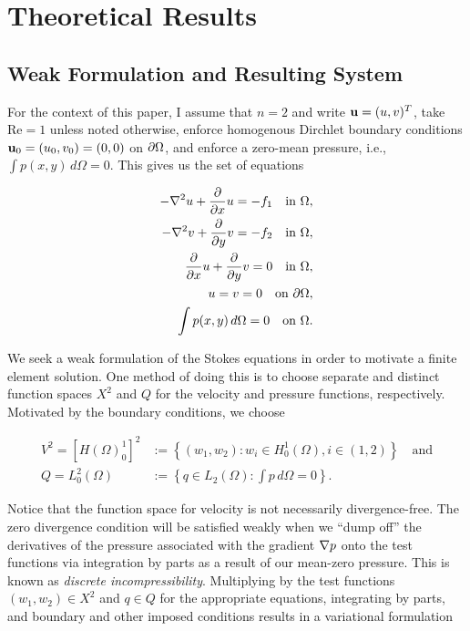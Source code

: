 \documentclass[12pt]{article}
\begin{document}
\section{Theoretical Results}

\subsection{Weak Formulation and Resulting System}

For the context of this paper, I assume that $n = 2$ and write $\mathbf{u} =
(u,v){^T}$, take $\text{Re} = 1$ unless noted otherwise, enforce homogenous
Dirchlet boundary conditions $\mathbf{u}_0 = (u_0, v_0) = (0, 0)$ on $\partial \Omega$,
and enforce a zero-mean pressure, i.e., $\int p(x,y) \, d\Omega = 0$. This
gives us the set of equations

\begin{equation}
    \begin{split}
        -\nabla^2 u + \frac{\partial}{\partial x} u = -f_1 \quad \text{in } \Omega, \\
        -\nabla^2 v + \frac{\partial}{\partial y} v = -f_2 \quad \text{in } \Omega, \\
        \frac{\partial}{\partial x} u + \frac{\partial}{\partial y} v = 0 \quad \text{in } \Omega, \\
        u = v = 0 \quad \text{on } \partial \Omega, \\
        \int p(x,y) \,d\Omega = 0 \quad \text{on } \Omega.
    \end{split}
\end{equation}

We seek a weak formulation of the Stokes equations in order to motivate a
finite element solution. One method of doing this is to choose separate and
distinct function spaces $X^2$ and $Q$ for the velocity and pressure
functions, respectively. Motivated by the boundary conditions, we choose

\begin{equation}
    \begin{split}
        V^2  = {\left[ {H(\Omega)}_{0}^{1} \right]}^{2} &:=
        \left\{(w_1, w_2) : w_i \in H_0^1(\Omega), i \in (1, 2)\right\}
        \quad \text{and} \\
        Q = L_0^2(\Omega) &:= \left\{q \in L_2(\Omega) : \int p \, d\Omega =0
        \right\}.
    \end{split}
\end{equation}

Notice that the function space for velocity is not necessarily divergence-free.
The zero divergence condition will be satisfied weakly when we ``dump off'' the
derivatives of the pressure associated with the gradient $\nabla p$ onto the test
functions via integration by parts as a result of our mean-zero pressure. This
is known as \textit{discrete incompressibility}. Multiplying by the test
functions $(w_1, w_2) \in X^2$ and $q \in Q$ for the appropriate equations,
integrating by parts, and boundary and other imposed conditions results in a
variational formulation
\end{document}
